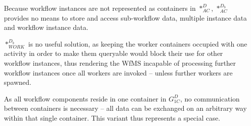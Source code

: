     Because workflow instances are not represented as containers in $*_{AC}^{D}$, $*_{AC}^{D_b}$ provides no means to store and access sub-workflow data, multiple instance data and workflow instance data.

    $*_{WORK}^{D_b}$ is no useful solution, as keeping the worker containers occupied with one activity in order to make them queryable would block their use for other workflow instances, thus rendering the \ac{WfMS} incapable of processing further workflow instances once all workers are invoked -- unless further workers are spawned.

    As all workflow components reside in one container in $G_{1C}^{D}$, no communication between containers is necessary -- all data can be exchanged on an arbitrary way within that single container. This variant thus represents a special case.

